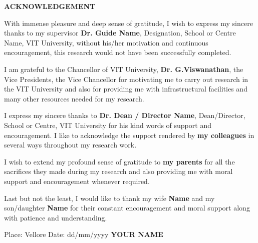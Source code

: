 {\centerline { {\textbf{ACKNOWLEDGEMENT}}}}

\vspace*{1cm}

\indent\indent With immense pleasure and deep sense of gratitude, I wish to express my sincere thanks to my supervisor {\bf Dr. Guide Name}, Designation, School or Centre Name, VIT University, without his/her motivation and continuous encouragement, this research would not have been successfully completed.

\indent\indent I am grateful to the Chancellor of VIT University, {\bf Dr. G.Viswanathan}, the Vice Presidents, the Vice Chancellor for motivating me to carry out research in the VIT University and also for providing me with infrastructural facilities and many other resources needed for my research.

\indent\indent I express my sincere thanks to {\bf Dr. Dean / Director Name}, Dean/Director, School or Centre, VIT University for his kind words of support and encouragement. I like to acknowledge the support rendered by {\bf my colleagues} in several ways throughout my research work.

\indent\indent I wish to extend my profound sense of gratitude to {\bf my parents} for all the sacrifices they made during my research and also providing me with moral support and encouragement whenever required.   

Last but not the least, I would like to thank my wife \textbf{Name} and my son/daughter \textbf{Name} for their constant encouragement and moral support along with patience and understanding.

\vskip 0.5cm
\noindent
Place: Vellore
\vskip 0.3cm
\noindent
Date: dd/mm/yyyy \qquad  \qquad \qquad \qquad \qquad \qquad \qquad \qquad \quad \textbf{YOUR NAME}

